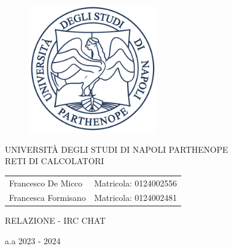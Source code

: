 \documentclass{tcc}
\begin{document}
\pagestyle{empty} 

\begin{figure}[H]
\centering
\includegraphics[width=0.5\textwidth]{imagens/logo.png} 
\end{figure}

\begin{center}
\Large
UNIVERSITÀ DEGLI STUDI DI NAPOLI PARTHENOPE \\
RETI DI CALCOLATORI

\end{center}

\vspace{1em}

\begin{center}
    \large
    \begin{tabular}{ll}
        Francesco De Micco & Matricola: 0124002556 \\
        Francesca Formisano & Matricola: 0124002481
    \end{tabular}
\end{center}


\vfill


\begin{center}
\LARGE{RELAZIONE - IRC CHAT}
\end{center}

\vspace{2in}

\begin{center}
\large
a.a 2023 - 2024
\end{center}
\afterpage{\addtocounter{page}{1}}

\newpage


\pagestyle{plain} 
\tableofcontents

\newpage

\newpage

\newpage

\newpage

\newpage

\end{document}
